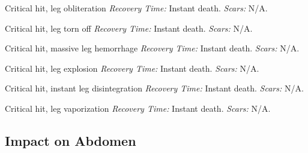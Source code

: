 \begin{description}[labelwidth=1.5em, leftmargin=*, itemsep=0.4em]
    \item[15 -] Critical hit, leg obliteration \textit{Recovery Time:} Instant death. \textit{Scars:} N/A.
    \item[16 -] Critical hit, leg torn off \textit{Recovery Time:} Instant death. \textit{Scars:} N/A.
    \item[17 -] Critical hit, massive leg hemorrhage \textit{Recovery Time:} Instant death. \textit{Scars:} N/A.
    \item[18 -] Critical hit, leg explosion \textit{Recovery Time:} Instant death. \textit{Scars:} N/A.
    \item[19 -] Critical hit, instant leg disintegration \textit{Recovery Time:} Instant death. \textit{Scars:} N/A.
    \item[20 -] Critical hit, leg vaporization \textit{Recovery Time:} Instant death. \textit{Scars:} N/A.
\end{description}

\subsection{Impact on Abdomen}

